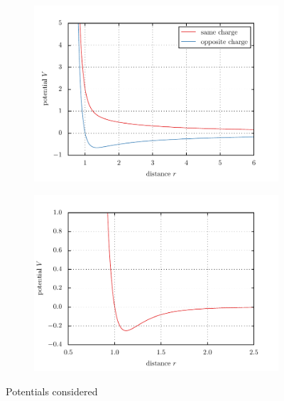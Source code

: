 \documentclass[11pt, a4paper]{article}
\numberwithin{equation}{section}
\begin{document}
\begin{figure}
	\begin{subfigure}{1.0\textwidth}
		\centering
		\includegraphics{./figures/potential_coulomb.pdf}
		\label{fig:coulomb_core}
	\end{subfigure}
	\begin{subfigure}{1.0\textwidth}
		\centering
		\includegraphics{./figures/potential_lennard_jones.pdf}
		\label{fig:lennard_jones}
	\end{subfigure}
	\caption{Potentials considered}	
\end{figure}
\end{document}
